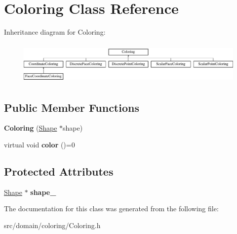 \hypertarget{class_coloring}{}\section{Coloring Class Reference}
\label{class_coloring}
Inheritance diagram for Coloring\+:\begin{figure}[H]
\begin{center}
\leavevmode
\includegraphics[height=2.113208cm]{class_coloring}
\end{center}
\end{figure}
\subsection*{Public Member Functions}
\begin{DoxyCompactItemize}
\item 
\hypertarget{class_coloring_a5502d0c484ca5f675019887da011a885}{}{\bfseries Coloring} (\hyperlink{class_shape}{Shape} $\ast$shape)\label{class_coloring_a5502d0c484ca5f675019887da011a885}

\item 
\hypertarget{class_coloring_a06fe1ecd857c9f4ccff469bec6123dd9}{}virtual void {\bfseries color} ()=0\label{class_coloring_a06fe1ecd857c9f4ccff469bec6123dd9}

\end{DoxyCompactItemize}
\subsection*{Protected Attributes}
\begin{DoxyCompactItemize}
\item 
\hypertarget{class_coloring_ae1c726b727a5a4a48cdc2999af0413d9}{}\hyperlink{class_shape}{Shape} $\ast$ {\bfseries shape\+\_\+}\label{class_coloring_ae1c726b727a5a4a48cdc2999af0413d9}

\end{DoxyCompactItemize}


The documentation for this class was generated from the following file\+:\begin{DoxyCompactItemize}
\item 
src/domain/coloring/Coloring.\+h\end{DoxyCompactItemize}
